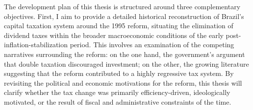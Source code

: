 \documentclass[11pt,a4paper]{article}
\begin{document}
\par
The development plan of this thesis is structured around three complementary objectives.  
First, I aim to provide a detailed historical reconstruction of Brazil’s capital taxation system around the 1995 reform, situating the elimination of dividend taxes within the broader macroeconomic conditions of the early post-inflation-stabilization period. This involves an examination of the competing narratives surrounding the reform: on the one hand, the government’s argument that double taxation discouraged investment; on the other, the growing literature suggesting that the reform contributed to a highly regressive tax system. By revisiting the political and economic motivations for the reform, this thesis will clarify whether the tax change was primarily efficiency-driven, ideologically motivated, or the result of fiscal and administrative constraints of the time.
\end{document}
